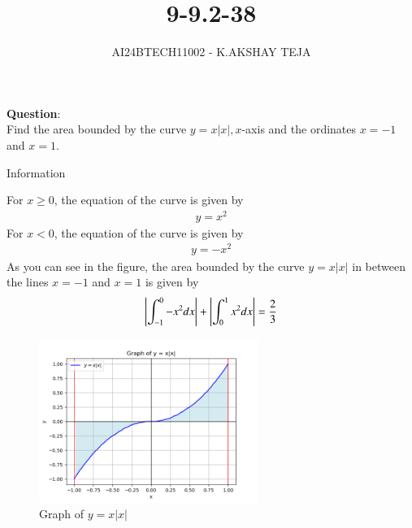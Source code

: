 \documentclass[journal]{IEEEtran}
\begin{document}

\vspace{3cm}

\title{9-9.2-38}
\author{AI24BTECH11002 - K.AKSHAY TEJA}
{\let\newpage\relax\maketitle}

\renewcommand{\thefigure}{\theenumi}
\renewcommand{\thetable}{\theenumi}
\setlength{\intextsep}{10pt} %


\renewcommand{\thetable}{\theenumi}


\textbf{Question}:\\
Find the area bounded by the curve $y = x|x|, x$-axis and the ordinates $x=-1$ and $x=1$.


 \solution
 \begin{table}[h!]
 	\centering
 	
 	\caption{Information}
 	\label{tab:9-9.2-38}
 \end{table}

For $x\geq0$, the equation of the curve is given by 
\begin{align}
    y = x^2
\end{align}
For $x<0$, the equation of the curve is given by 
\begin{align}
    y = -x^2
\end{align}
As you can see in the figure, the area bounded by the curve $y = x|x|$ in between the lines $x = -1$ and $x = 1$ is given by
\begin{align}
	\left\vert\int_{-1}^{0} -x^2dx\right\vert + \left\vert\int_{0}^{1} x^2dx\right\vert = \frac{2}{3} 
\end{align}
 \begin{figure}[h!]
 \begin{center}
 	\includegraphics[width=0.635\textwidth]{Fig/fig.png}
 	\caption{Graph of $ y = x|x|$}
 	\label{fig:9-9.2-38 - Figure -1}
 \end{center}
 \end{figure}
\end{document}

